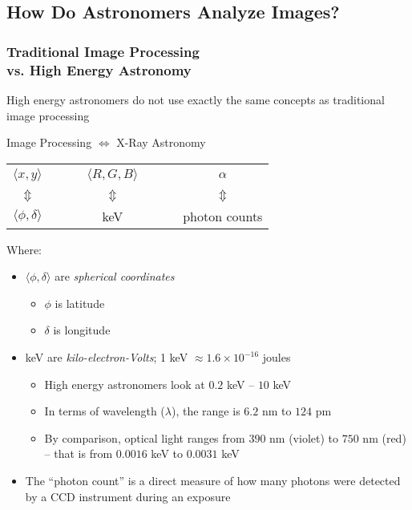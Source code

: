 \subsection{How Do Astronomers Analyze Images?}
\begin{frame}[allowframebreaks]
\frametitle{Traditional Image Processing \\
vs. High Energy Astronomy}
High energy astronomers \alert{do not} use exactly the same concepts as traditional image processing
\begin{center}
  \begin{minipage}{0.75\textwidth}
\begin{block}{\centering Image Processing $\Leftrightarrow$ X-Ray Astronomy}
\begin{center}
      \begin{tabular}{ccccc}
      $\langle x, y\rangle$ & \ \ \ & $\langle R, G, B\rangle$ & \ \ \ & $\alpha$\\
      $\Updownarrow$  & & $\Updownarrow$  &  & $\Updownarrow$ \\
      $\langle \phi, \delta\rangle$ &  & \textup{keV} &  & \textup{photon counts}
      \end{tabular}
\end{center}
\end{block}
\end{minipage}
\end{center}

\framebreak

Where:
\begin{itemize}
\item $\langle \phi,\delta\rangle$ are \emph{spherical coordinates}
	\begin{itemize}
	\item $\phi$ is latitude
	\item $\delta$ is longitude
	\end{itemize}
\item keV are \emph{kilo-electron-Volts}; 1 keV $\approx 1.6\times10^{-16}$ joules
	\begin{itemize}
	\item High energy astronomers look at $0.2$ keV -- $10$ keV
	\item In terms of wavelength ($\lambda$), the range is $6.2$ nm to $124$ pm
	\item By comparison, optical light ranges from $390$ nm (violet) to $750$ nm (red) -- that is from $0.0016$ keV to $0.0031$ keV
	\end{itemize}
\item The ``photon count'' is a direct measure of how many photons were detected by a CCD instrument during an exposure
\end{itemize}
\end{frame}
